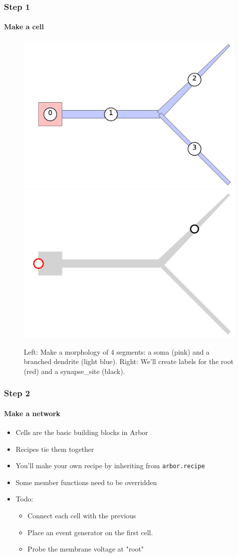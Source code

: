 \documentclass[t]{beamer}
\begin{document}
\begin{frame}
    \frametitle{Step 1}
    \framesubtitle{Make a cell}
    \begin{figure}[h]
        \begin{center}
            \includegraphics[width=0.45\linewidth]{tutorial_network_ring_morph}
            \hspace{2em}
            \includegraphics[width=0.45\linewidth]{tutorial_network_ring_synapse_site}
        \end{center}
        \caption{Left: Make a morphology of 4 segments: a soma (pink) and a branched dendrite (light blue). Right: We’ll create labels for the root (red) and a synapse\_site (black).}
    \end{figure}
\end{frame}


\begin{frame}
    \frametitle{Step 2}
    \framesubtitle{Make a network}
    \begin{itemize}
        \item Cells are the basic building blocks in Arbor
        \item Recipes tie them together
        \item You’ll make your own recipe by inheriting from \texttt{arbor.recipe}
        \item Some member functions need to be overridden
        \item Todo:
        \begin{itemize}
            \item Connect each cell with the previous
            \item Place an event generator on the first cell.
            \item Probe the membrane voltage at "root"
        \end{itemize}
    \end{itemize}
\end{frame}
\end{document}
